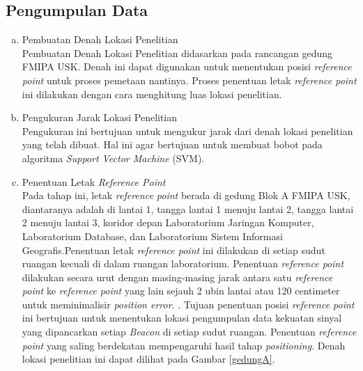 \subsection{Pengumpulan Data}
\begin{enumerate}[a.]
	\itemsep0em
	\item Pembuatan Denah Lokasi Penelitian
	      \\
	      Pembuatan Denah Lokasi Penelitian didasarkan pada rancangan gedung FMIPA USK. Denah ini dapat digunakan untuk menentukan posisi \textit{reference point} untuk proses pemetaan nantinya. Proses penentuan letak \textit{reference point} ini dilakukan dengan cara menghitung luas lokasi penelitian.

	\item Pengukuran Jarak Lokasi Penelitian
	      \\
	      Pengukuran ini bertujuan untuk mengukur jarak dari denah lokasi penelitian yang telah dibuat. Hal ini agar bertujuan untuk membuat bobot pada algoritma \textit{Support Vector Machine} (SVM).

	\item Penentuan Letak \textit{Reference Point}
	      \\
	      Pada tahap ini, letak \textit{reference point} berada di gedung Blok A FMIPA USK, diantaranya adalah di lantai 1, tangga lantai 1 menuju lantai 2, tangga lantai 2 menuju lantai 3, koridor depan Laboratorium Jaringan Komputer, Laboratorium Database, dan Laboratorium Sistem Informasi Geografis.Penentuan letak \textit{reference point} ini dilakukan di setiap sudut ruangan kecuali di dalam ruangan laboratorium. Penentuan \textit{reference point} dilakukan secara urut dengan masing-masing jarak antara satu \textit{reference point} ke \textit{reference point} yang lain sejauh 2 ubin lantai atau 120 centimeter untuk meminimalisir \textit{position error}. \citep{Lee2019} \citep{Bahl2000}. Tujuan penentuan posisi \textit{reference point} ini bertujuan untuk menentukan lokasi pengumpulan data kekuatan sinyal yang dipancarkan setiap \textit{Beacon} di setiap sudut ruangan. Penentuan \textit{reference point} yang saling berdekatan mempengaruhi hasil tahap \textit{positioning}. Denah lokasi penelitian ini dapat dilihat pada Gambar \ref{gedungA}.


\end{enumerate}
